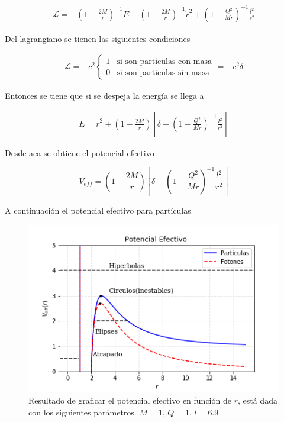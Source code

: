 \documentclass[DIN, pagenumber=false, fontsize=11pt, parskip=half]{scrartcl}
\begin{document}
\begin{eqnarray*}
    \mathcal{L} = -\left(1-\frac{2M}{r}\right)^{-1}E + \left(1-\frac{2M}{r}\right)^{-1}\dot{r}^{2} + \left(1-\frac{Q^{2}}{Mr}\right)^{-1}\frac{l^{2}}{r^{2}}
\end{eqnarray*}

Del lagrangiano se tienen las siguientes condiciones 

\begin{eqnarray}
\label{delta}
     \mathcal{L} =  -c^{2}\left \{ \begin{matrix} 1 & \mbox{si son partículas con masa} 
\\ 0 & \mbox{si son particulas sin masa}\end{matrix}\right. = -c^{2}\delta 
\end{eqnarray}

Entonces se tiene que si se despeja la energía se llega a 

\begin{eqnarray}
\label{Energia}
    E = \dot{r}^{2}+\left(1-\frac{2M}{r}\right)\left[\delta +\left(1-\frac{Q^{2}}{Mr}\right)^{-1}\frac{l^{2}}{r^{2}}\right]
\end{eqnarray}

Desde aca se obtiene el potencial efectivo 

\begin{equation}
    V_{eff} = \left(1-\frac{2M}{r}\right)\left[\delta +\left(1-\frac{Q^{2}}{Mr}\right)^{-1}\frac{l^{2}}{r^{2}}\right]
\end{equation}

A continuación el potencial efectivo para partículas 

\begin{figure}[H]
\centerline{\includegraphics[scale =0.8]{Particulas.png}}
\caption{Resultado de graficar el potencial efectivo en función de $r$, está dada con los siguientes parámetros. $M = 1$, $Q = 1$, $l = 6.9$}
    \label{2}
\end{figure}
\end{document}

